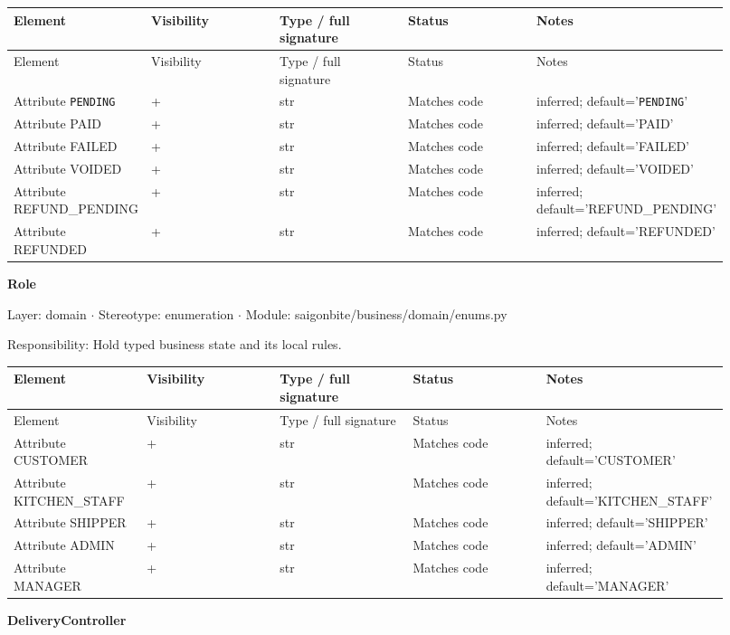 \begin{longtable}{>{\raggedright\arraybackslash}p{0.1840\linewidth}>{\raggedright\arraybackslash}p{0.1840\linewidth}>{\raggedright\arraybackslash}p{0.1840\linewidth}>{\raggedright\arraybackslash}p{0.1840\linewidth}>{\raggedright\arraybackslash}p{0.1840\linewidth}}
Element & Visibility & Type / full signature & Status & Notes \\
\hline\endfirsthead
Element & Visibility & Type / full signature & Status & Notes \\
\hline\endhead
Attribute \texttt{PENDING} & + & str & Matches code & inferred; default='\texttt{PENDING}' \\
Attribute PAID & + & str & Matches code & inferred; default='PAID' \\
Attribute FAILED & + & str & Matches code & inferred; default='FAILED' \\
Attribute VOIDED & + & str & Matches code & inferred; default='VOIDED' \\
Attribute REFUND\_PENDING & + & str & Matches code & inferred; default='REFUND\_PENDING' \\
Attribute REFUNDED & + & str & Matches code & inferred; default='REFUNDED' \\
\end{longtable}
\textbf{Role}

Layer: domain \ensuremath{\cdot} Stereotype: \guillemotleft{}enumeration\guillemotright{} \ensuremath{\cdot} Module: saigonbite/business/domain/enums.py

Responsibility: Hold typed business state and its local rules.

\begin{longtable}{>{\raggedright\arraybackslash}p{0.1840\linewidth}>{\raggedright\arraybackslash}p{0.1840\linewidth}>{\raggedright\arraybackslash}p{0.1840\linewidth}>{\raggedright\arraybackslash}p{0.1840\linewidth}>{\raggedright\arraybackslash}p{0.1840\linewidth}}
Element & Visibility & Type / full signature & Status & Notes \\
\hline\endfirsthead
Element & Visibility & Type / full signature & Status & Notes \\
\hline\endhead
Attribute CUSTOMER & + & str & Matches code & inferred; default='CUSTOMER' \\
Attribute KITCHEN\_STAFF & + & str & Matches code & inferred; default='KITCHEN\_STAFF' \\
Attribute SHIPPER & + & str & Matches code & inferred; default='SHIPPER' \\
Attribute ADMIN & + & str & Matches code & inferred; default='ADMIN' \\
Attribute MANAGER & + & str & Matches code & inferred; default='MANAGER' \\
\end{longtable}
\textbf{DeliveryController}

